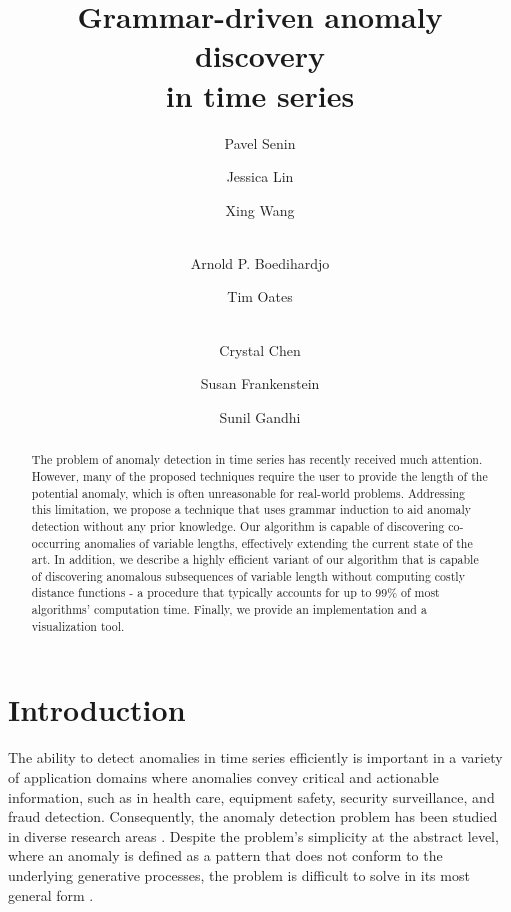 \documentclass{llncs}
\title{Grammar-driven anomaly discovery \\ in time series}
\begin{document}
 
\author{Pavel Senin \and Jessica Lin  \and Xing Wang  \and \\Arnold P. Boedihardjo \and Tim Oates \and \\ Crystal Chen \and Susan Frankenstein \and Sunil Gandhi}

\maketitle

\begin{abstract}
The problem of anomaly detection in time series has recently received much attention. 
However, many of the proposed techniques require the user to provide the length of the potential anomaly, which is often unreasonable for real-world problems. 
Addressing this limitation, we propose a technique that uses grammar induction to aid anomaly detection without any prior knowledge.  
Our algorithm is capable of discovering co-occurring anomalies of variable lengths, effectively extending the current state of the art.
In addition, we describe a highly efficient variant of our algorithm that is capable of discovering anomalous subsequences of variable length without computing costly distance functions - a procedure that typically accounts for up to 99\% of most algorithms' computation time. 
Finally, we provide an implementation and a visualization tool.


\end{abstract}


\section{Introduction}
The ability to detect anomalies in time series efficiently is important in a variety of application domains where anomalies convey critical and actionable information, such as in health care, equipment safety, security surveillance, and fraud detection. Consequently, the anomaly detection problem has been studied in diverse research areas \cite{outliers_survey}. Despite the problem's simplicity at the abstract level, where an anomaly is defined as a pattern that does not conform to the underlying generative processes, the problem is difficult to solve in its most general form \cite{chan_anomaly}.
\end{document}
